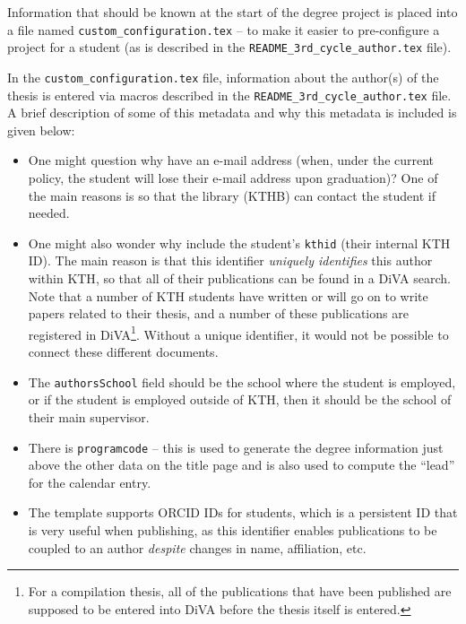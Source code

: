 \documentclass[12pt, twoside]{article}
\newcommand{\fname}[1]{\texttt{#1}}
\begin{document}
Information that should be known at the start of the degree project is placed into a file named \fname{custom\_configuration.tex} – to make it easier to pre-configure a project for a student (as is described in the \fname{README\_3rd\_cycle\_author.tex} file).

In the  \fname{custom\_configuration.tex} file, information about the author(s) of the thesis is entered via macros described in the \fname{README\_3rd\_cycle\_author.tex} file. A brief description of some of this metadata and why this metadata is included is given below:
\begin{itemize}
    \item One might question why have an e-mail address (when, under the current policy, the student will lose their e-mail address upon graduation)? One of the main reasons is so that the library (\ie \gls{KTHB}) can contact the student if needed.
    
    \item One might also wonder why include the student’s \texttt{kthid} (\ie their internal KTH ID). The main reason is that this identifier \textit{uniquely identifies} this author within \gls{KTH}, so that all of their publications can be found in a \gls{DiVA} search. Note that a number of \gls{KTH} students have written or will go on to write papers related to their thesis, and a number of these publications are registered in \gls{DiVA}\footnote{For a compilation thesis, all of the publications that have been published are supposed to be entered into \gls{DiVA} before the thesis itself is entered.}. Without a unique identifier, it would not be possible to connect these different documents.
    
    \item The \texttt{authorsSchool} field should be the school where the student is employed, or if the student is employed outside of \gls{KTH}, then it should be the school of their main supervisor.
    
    \item There is \texttt{programcode} – this is used to generate the degree information just above the other data on the title page and is also used to compute the \enquote{lead} for the calendar entry.

    \item The template supports ORCID IDs for students, which is a persistent ID that is very useful when publishing, as this identifier enables publications to be coupled to an author \textit{despite} changes in name, affiliation, etc.


\end{itemize}
\end{document}

